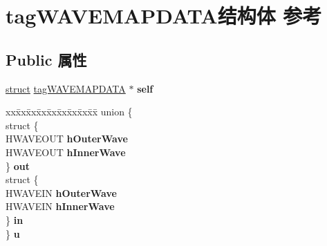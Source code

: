 \hypertarget{structtag_w_a_v_e_m_a_p_d_a_t_a}{}\section{tag\+W\+A\+V\+E\+M\+A\+P\+D\+A\+T\+A结构体 参考}
\label{structtag_w_a_v_e_m_a_p_d_a_t_a}
\subsection*{Public 属性}
\begin{DoxyCompactItemize}
\item 
\mbox{\label{structtag_w_a_v_e_m_a_p_d_a_t_a_aba05dfed7109970db8d76ced164d7ff0}} 
\hyperlink{interfacestruct}{struct} \hyperlink{structtag_w_a_v_e_m_a_p_d_a_t_a}{tag\+W\+A\+V\+E\+M\+A\+P\+D\+A\+TA} $\ast$ {\bfseries self}
\item 
\mbox{\label{structtag_w_a_v_e_m_a_p_d_a_t_a_a362574f433cbd4dcd5f0bf9a88ac2e00}} 
\begin{tabbing}
xx\=xx\=xx\=xx\=xx\=xx\=xx\=xx\=xx\=\kill
union \{\\
\>struct \{\\
\>\>HWAVEOUT {\bfseries hOuterWave}\\
\>\>HWAVEOUT {\bfseries hInnerWave}\\
\>\} {\bfseries out}\\
\>struct \{\\
\>\>HWAVEIN {\bfseries hOuterWave}\\
\>\>HWAVEIN {\bfseries hInnerWave}\\
\>\} {\bfseries in}\\
\} {\bfseries u}\\


\end{tabbing}
\end{DoxyCompactItemize}
